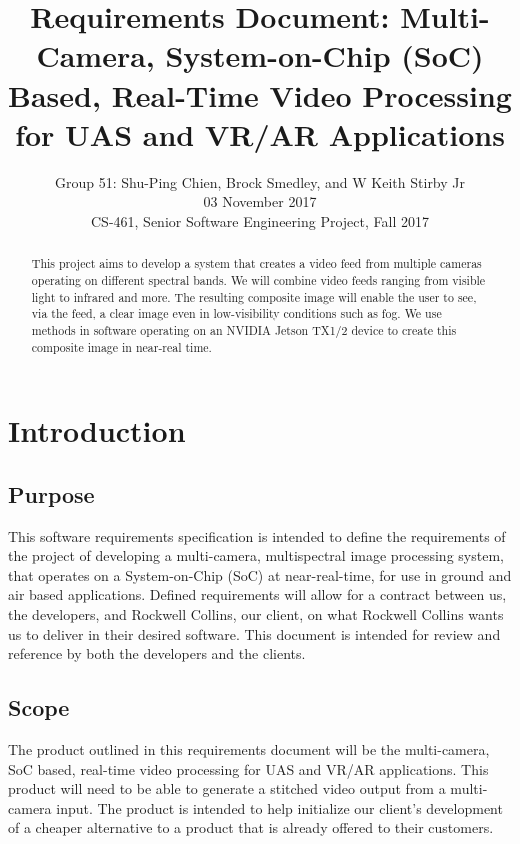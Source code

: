 \documentclass[letterpaper,10pt,serif,draftclsnofoot,onecolumn,compsoc,titlepage]{IEEEtran}
\title{Requirements Document: Multi-Camera, System-on-Chip (SoC) Based, Real-Time Video Processing for UAS and VR/AR Applications}
\author{Group 51: Shu-Ping Chien, Brock Smedley, and W Keith Stirby Jr \\ 03 November 2017 \\ CS-461, Senior Software Engineering Project, Fall 2017}
\begin{document}
\begin{titlepage}
\maketitle
\begin{abstract}

This project aims to develop a system that creates a video feed from multiple cameras operating on different spectral bands. We will combine video feeds ranging from visible light to infrared and more. The resulting composite image will enable the user to see, via the feed, a clear image even in low-visibility conditions such as fog. We use methods in software operating on an NVIDIA Jetson TX1/2 device to create this composite image in near-real time.


\end{abstract}
\end{titlepage}
\newpage

\tableofcontents
\newpage

\section{Introduction}

\subsection{Purpose}

This software requirements specification is intended to define the requirements of the 
project of developing a multi-camera, multispectral image processing system, that 
operates on a System-on-Chip (SoC) at near-real-time, for use in ground and air based 
applications. Defined requirements will allow for a contract between us, the 
developers, and Rockwell Collins, our client, on what Rockwell Collins wants us to 
deliver in their desired software. This document is intended for review and reference 
by both the developers and the clients.\\

\subsection{Scope}

The product outlined in this requirements document will be the multi-camera, SoC based,
 real-time video processing for UAS and VR/AR applications. This product will need to 
 be able to generate a stitched video output from a multi-camera input. The product is 
 intended to help initialize our client's development of a cheaper alternative to a 
 product that is already offered to their customers.\\
\end{document}
